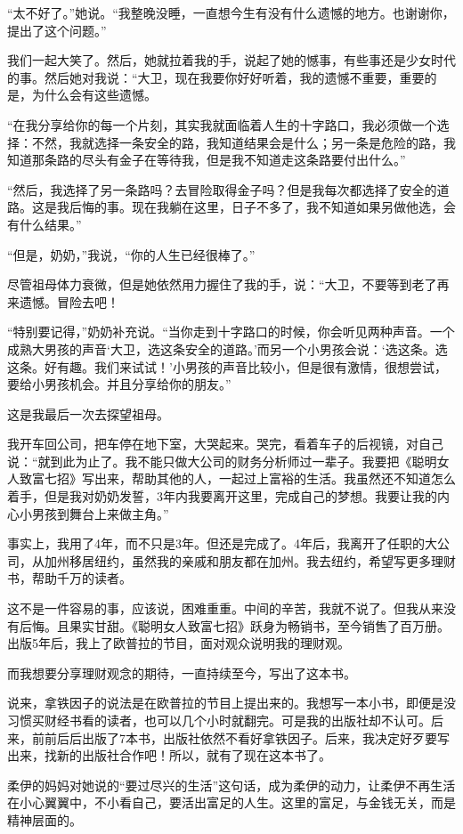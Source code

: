 “太不好了。”她说。“我整晚没睡，一直想今生有没有什么遗憾的地方。也谢谢你，提出了这个问题。”

我们一起大笑了。然后，她就拉着我的手，说起了她的憾事，有些事还是少女时代的事。然后她对我说：“大卫，现在我要你好好听着，我的遗憾不重要，重要的是，为什么会有这些遗憾。

“在我分享给你的每一个片刻，其实我就面临着人生的十字路口，我必须做一个选择：不然，我就选择一条安全的路，我知道结果会是什么；另一条是危险的路，我知道那条路的尽头有金子在等待我，但是我不知道走这条路要付出什么。”

“然后，我选择了另一条路吗？去冒险取得金子吗？但是我每次都选择了安全的道路。这是我后悔的事。现在我躺在这里，日子不多了，我不知道如果另做他选，会有什么结果。”

“但是，奶奶，”我说，“你的人生已经很棒了。”

尽管祖母体力衰微，但是她依然用力握住了我的手，说：“大卫，不要等到老了再来遗憾。冒险去吧！

“特别要记得，”奶奶补充说。“当你走到十字路口的时候，你会听见两种声音。一个成熟大男孩的声音‘大卫，选这条安全的道路。’而另一个小男孩会说：‘选这条。选这条。好有趣。我们来试试！’小男孩的声音比较小，但是很有激情，很想尝试，要给小男孩机会。并且分享给你的朋友。”

这是我最后一次去探望祖母。

我开车回公司，把车停在地下室，大哭起来。哭完，看着车子的后视镜，对自己说：“就到此为止了。我不能只做大公司的财务分析师过一辈子。我要把《聪明女人致富七招》写出来，帮助其他的人，一起过上富裕的生活。我虽然还不知道怎么着手，但是我对奶奶发誓，3年内我要离开这里，完成自己的梦想。我要让我的内心小男孩到舞台上来做主角。”

事实上，我用了4年，而不只是3年。但还是完成了。4年后，我离开了任职的大公司，从加州移居纽约，虽然我的亲戚和朋友都在加州。我去纽约，希望写更多理财书，帮助千万的读者。

这不是一件容易的事，应该说，困难重重。中间的辛苦，我就不说了。但我从来没有后悔。且果实甘甜。《聪明女人致富七招》跃身为畅销书，至今销售了百万册。出版5年后，我上了欧普拉的节目，面对观众说明我的理财观。

而我想要分享理财观念的期待，一直持续至今，写出了这本书。

说来，拿铁因子的说法是在欧普拉的节目上提出来的。我想写一本小书，即便是没习惯买财经书看的读者，也可以几个小时就翻完。可是我的出版社却不认可。后来，前前后后出版了7本书，出版社依然不看好拿铁因子。后来，我决定好歹要写出来，找新的出版社合作吧！所以，就有了现在这本书了。

柔伊的妈妈对她说的“要过尽兴的生活”这句话，成为柔伊的动力，让柔伊不再生活在小心翼翼中，不小看自己，要活出富足的人生。这里的富足，与金钱无关，而是精神层面的。

